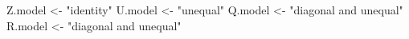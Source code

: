 \begin{Schunk}
\begin{Sinput}
 Z.model <- "identity"
 U.model <- "unequal"
 Q.model <- "diagonal and unequal"
 R.model <- "diagonal and unequal"
\end{Sinput}
\end{Schunk}
